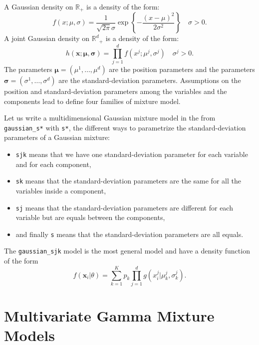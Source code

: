 \documentclass[a4paper,10pt]{article}
\newcommand{\R}{\mathbb{R}}
\newcommand{\Rd}{{\mathbb{R}^d}}
\newcommand{\bx}{\mathbf{x}}
\newcommand{\bsigma}{\boldsymbol{\sigma}}
\newcommand{\bmu}{\boldsymbol{\mu}}
\begin{document}
A Gaussian density on $\R_+$ is a density of the form:
\begin{equation}\label{law::gaussian-density}
f(x;\mu,\sigma) = \frac{1}{\sqrt{2\pi} \sigma} \exp\left\{- \frac{(x-\mu)^2}{2\sigma^2}\right\} \quad \sigma>0.
\end{equation}
A joint Gaussian density on $\Rd_+$ is a density of the form:
\begin{equation}\label{law::joint-gaussian-density}
h(\bx;\bmu,\bsigma) = \prod_{j=1}^d f(x^j;\mu^j,\sigma^j) \quad \sigma^j>0.
\end{equation}
The parameters $\bmu=(\mu^1,\ldots,\mu^d)$ are the position parameters and the parameters $\bsigma=(\sigma^1,\ldots,\sigma^d)$
are the standard-deviation parameters. Assumptions on the position and standard-deviation parameters among the variables and the components
lead to define four families of mixture model.

Let us write a multidimensional Gaussian mixture model in the from \verb+gaussian_s*+
with \verb+s*+, the different ways to parametrize the standard-deviation parameters of a Gaussian mixture:
\begin{itemize}
\item \verb+sjk+ means that we have one standard-deviation parameter for each variable and for each component,
\item \verb+sk+ means that the standard-deviation parameters are the same for all the variables inside a component,
\item \verb+sj+ means that the standard-deviation parameters are different for each variable but are equals between the components,
\item and finally \verb+s+ means that the standard-deviation parameters are all equals.
\end{itemize}

The \verb+gaussian_sjk+ model is the most general model and have a density function of the form
\begin{equation}\label{eq:f_sjk}
  f({\bx}_i|\theta) = \sum_{k=1}^K p_k \prod_{j=1}^d g(x^j_{i}| \mu^j_{k}, \sigma^j_{k}).
\end{equation}

\section{Multivariate Gamma Mixture Models}
\end{document}
